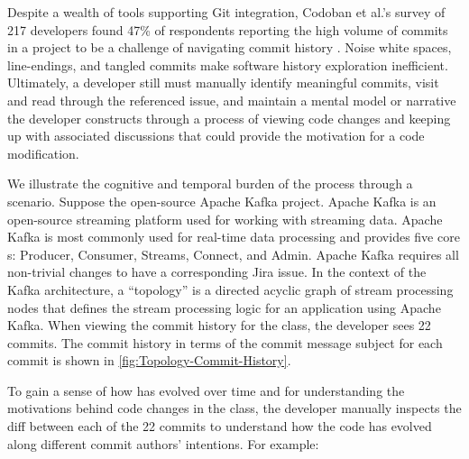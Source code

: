 Despite a wealth of tools supporting Git integration, Codoban et al.'s survey of 217 developers found 47\% of respondents reporting the high volume of commits in a project to be a challenge of navigating commit history \cite{codoban_software_2015}. 
Noise \eg white spaces, line-endings, and tangled commits make software history exploration inefficient. 
Ultimately, a developer still must manually identify meaningful commits, visit and read through the referenced issue, and maintain a mental model or narrative the developer constructs through a process of viewing code changes and keeping up with associated discussions that could provide the motivation for a code modification. 


We illustrate the cognitive and temporal burden of the process through a scenario.
Suppose  the open-source Apache Kafka project. 
Apache Kafka is an open-source streaming platform used for working with streaming data. 
Apache Kafka is most commonly used for real-time data processing and provides five core s: 
Producer, Consumer, Streams, Connect, and Admin.
Apache Kafka requires all non-trivial changes to have a corresponding Jira issue. 
In the context of the Kafka architecture, a ``topology'' is a directed acyclic graph of stream processing nodes 
that defines the stream processing logic for an application using Apache Kafka.
When viewing the commit history for the  class, the developer sees 22 commits.
The commit history in terms of the commit message subject for each commit is shown in \autoref{fig:Topology-Commit-History}.

To gain a sense of how  has evolved over time 
and for understanding the motivations behind code changes in the class, 
the developer manually inspects the diff between each of the 22 commits to understand 
how the code has evolved along different commit authors' intentions.
For example: 

